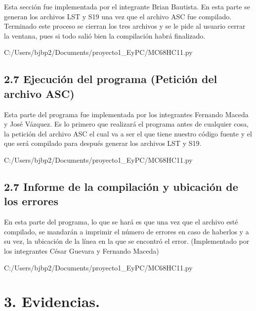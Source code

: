 \documentclass[letterpaper]{report}
\begin{document}
    Esta sección fue implementada por el integrante Brian Bautista. 
    En esta parte se generan los archivos LST y S19 una vez que el archivo ASC 
    fue compilado. Terminado este proceso se cierran los tres archivos y se le pide
    al usuario cerrar la ventana, pues si todo salió bien la compilación habrá
    finalizado.

    
    {C:/Users/bjbp2/Documents/proyecto1_EyPC/MC68HC11.py}

    \subsection*{2.7 Ejecuci\'on del programa (Petici\'on del archivo ASC)}
    
    Esta parte del programa fue implementada por los integrantes Fernando Maceda
    y Jos\'e Vázquez. Es lo primero que realizará el programa antes de cualquier 
    cosa, la petición del archivo ASC el cual va a ser el que tiene nuestro código
    fuente y el que será compilado para después generar los archivos LST y S19.

    
    {C:/Users/bjbp2/Documents/proyecto1_EyPC/MC68HC11.py}

    \subsection*{2.7 Informe de la compilaci\'on y ubicaci\'on de los errores}
    
    En esta parte del programa, lo que se hará es que una vez que el archivo esté
    compilado, se mandarán a imprimir el número de errores en caso de haberlos y a su
    vez, la ubicación de la línea en la que se encontró el error.
    (Implementado por los integrantes César Guevara y Fernando Maceda)


    
    {C:/Users/bjbp2/Documents/proyecto1_EyPC/MC68HC11.py}
    
                
    \section*{3. Evidencias.}
\end{document}
